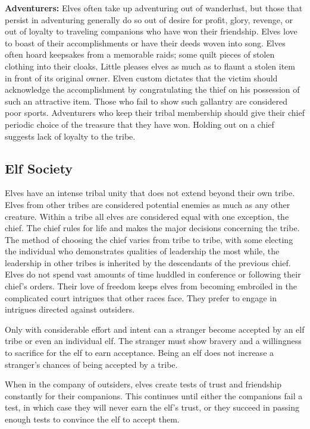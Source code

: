 \documentclass[10pt,a4paper,twocolumn]{d20}
\begin{document}
\textbf{Adventurers:} Elves often take up adventuring out of wanderlust, but those that persist in adventuring generally do so out of desire for profit, glory, revenge, or out of loyalty to traveling companions who have won their friendship. Elves love to boast of their accomplishments or have their deeds woven into song. Elves often hoard keepsakes from a memorable raids; some quilt pieces of stolen clothing into their cloaks. Little pleases elves as much as to flaunt a stolen item in front of its original owner. Elven custom dictates that the victim should acknowledge the accomplishment by congratulating the thief on his possession of such an attractive item. Those who fail to show such gallantry are considered poor sports. Adventurers who keep their tribal membership should give their chief periodic choice of the treasure that they have won. Holding out on a chief suggests lack of loyalty to the tribe.

\subsection{Elf Society}
Elves have an intense tribal unity that does not extend beyond their own tribe. Elves from other tribes are considered potential enemies as much as any other creature. Within a tribe all elves are considered equal with one exception, the chief. The chief rules for life and makes the major decisions concerning the tribe. The method of choosing the chief varies from tribe to tribe, with some electing the individual who demonstrates qualities of leadership the most while, the leadership in other tribes is inherited by the descendants of the previous chief. Elves do not spend vast amounts of time huddled in conference or following their chief’s orders. Their love of freedom keeps elves from becoming embroiled in the complicated court intrigues that other races face. They prefer to engage in intrigues directed against outsiders.

Only with considerable effort and intent can a stranger become accepted by an elf tribe or even an individual elf. The stranger must show bravery and a willingness to sacrifice for the elf to earn acceptance. Being an elf does not increase a stranger’s chances of being accepted by a tribe.

When in the company of outsiders, elves create tests of trust and friendship constantly for their companions. This continues until either the companions fail a test, in which case they will never earn the elf’s trust, or they succeed in passing enough tests to convince the elf to accept them.
\end{document}
